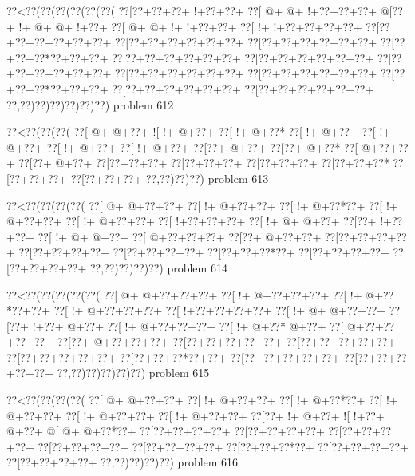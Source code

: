 \vbox{\vbox{\goo
\0??<\0??(\0??(\0??(\0??(\0??(\0??(
\0??[\0??+\0??+\0??+\- !+\0??+\0??+
\0??[\- @+\- @+\- !+\0??+\0??+\0??+
\- @[\0??+\- !+\- @+\- @+\- !+\0??+
\0??[\- @+\- @+\- !+\- !+\0??+\0??+
\0??[\- !+\- !+\0??+\0??+\0??+\0??+
\0??[\0??+\0??+\0??+\0??+\0??+\0??+
\0??[\0??+\0??+\0??+\0??+\0??+\0??+
\0??[\0??+\0??+\0??+\0??+\0??+\0??+
\0??[\0??+\0??+\0??*\0??+\0??+\0??+
\0??[\0??+\0??+\0??+\0??+\0??+\0??+
\0??[\0??+\0??+\0??+\0??+\0??+\0??+
\0??[\0??+\0??+\0??+\0??+\0??+\0??+
\0??[\0??+\0??+\0??+\0??+\0??+\0??+
\0??[\0??+\0??+\0??+\0??+\0??+\0??+
\0??[\0??+\0??+\0??*\0??+\0??+\0??+
\0??[\0??+\0??+\0??+\0??+\0??+\0??+
\0??[\0??+\0??+\0??+\0??+\0??+\0??+
\0??,\0??)\0??)\0??)\0??)\0??)\0??)
}
\hfil problem 612\hfil\break
}

\vbox{\vbox{\goo
\0??<\0??(\0??(\0??(
\0??[\- @+\- @+\0??+
\- ![\- !+\- @+\0??+
\0??[\- !+\- @+\0??*
\0??[\- !+\- @+\0??+
\0??[\- !+\- @+\0??+
\0??[\- !+\- @+\0??+
\0??[\- !+\- @+\0??+
\0??[\0??+\- @+\0??+
\0??[\0??+\- @+\0??*
\0??[\- @+\0??+\0??+
\0??[\0??+\- @+\0??+
\0??[\0??+\0??+\0??+
\0??[\0??+\0??+\0??+
\0??[\0??+\0??+\0??+
\0??[\0??+\0??+\0??*
\0??[\0??+\0??+\0??+
\0??[\0??+\0??+\0??+
\0??,\0??)\0??)\0??)
}
\hfil problem 613\hfil\break
}

\vbox{\vbox{\goo
\0??<\0??(\0??(\0??(\0??(
\0??[\- @+\- @+\0??+\0??+
\0??[\- !+\- @+\0??+\0??+
\0??[\- !+\- @+\0??*\0??+
\0??[\- !+\- @+\0??+\0??+
\0??[\- !+\- @+\0??+\0??+
\0??[\- !+\0??+\0??+\0??+
\0??[\- !+\- @+\- @+\0??+
\0??[\0??+\- !+\0??+\0??+
\0??[\- !+\- @+\- @+\0??+
\0??[\- @+\0??+\0??+\0??+
\0??[\0??+\- @+\0??+\0??+
\0??[\0??+\0??+\0??+\0??+
\0??[\0??+\0??+\0??+\0??+
\0??[\0??+\0??+\0??+\0??+
\0??[\0??+\0??+\0??*\0??+
\0??[\0??+\0??+\0??+\0??+
\0??[\0??+\0??+\0??+\0??+
\0??,\0??)\0??)\0??)\0??)
}
\hfil problem 614\hfil\break
}

\vbox{\vbox{\goo
\0??<\0??(\0??(\0??(\0??(\0??(
\0??[\- @+\- @+\0??+\0??+\0??+
\0??[\- !+\- @+\0??+\0??+\0??+
\0??[\- !+\- @+\0??*\0??+\0??+
\0??[\- !+\- @+\0??+\0??+\0??+
\0??[\- !+\0??+\0??+\0??+\0??+
\0??[\- !+\- @+\- @+\0??+\0??+
\0??[\0??+\- !+\0??+\- @+\0??+
\0??[\- !+\- @+\0??+\0??+\0??+
\0??[\- !+\- @+\0??*\- @+\0??+
\0??[\- @+\0??+\0??+\0??+\0??+
\0??[\0??+\- @+\0??+\0??+\0??+
\0??[\0??+\0??+\0??+\0??+\0??+
\0??[\0??+\0??+\0??+\0??+\0??+
\0??[\0??+\0??+\0??+\0??+\0??+
\0??[\0??+\0??+\0??*\0??+\0??+
\0??[\0??+\0??+\0??+\0??+\0??+
\0??[\0??+\0??+\0??+\0??+\0??+
\0??,\0??)\0??)\0??)\0??)\0??)
}
\hfil problem 615\hfil\break
}

\vbox{\vbox{\goo
\0??<\0??(\0??(\0??(\0??(
\0??[\- @+\- @+\0??+\0??+
\0??[\- !+\- @+\0??+\0??+
\0??[\- !+\- @+\0??*\0??+
\0??[\- !+\- @+\0??+\0??+
\0??[\- !+\- @+\0??+\0??+
\0??[\- !+\- @+\0??+\0??+
\0??[\0??+\- !+\- @+\0??+
\- ![\- !+\0??+\- @+\0??+
\- @[\- @+\- @+\0??*\0??+
\0??[\0??+\0??+\0??+\0??+
\0??[\0??+\0??+\0??+\0??+
\0??[\0??+\0??+\0??+\0??+
\0??[\0??+\0??+\0??+\0??+
\0??[\0??+\0??+\0??+\0??+
\0??[\0??+\0??+\0??*\0??+
\0??[\0??+\0??+\0??+\0??+
\0??[\0??+\0??+\0??+\0??+
\0??,\0??)\0??)\0??)\0??)
}
\hfil problem 616\hfil\break
}

